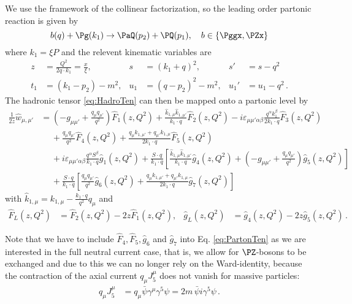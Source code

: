 We use the framework of the collinear factorization, so the leading order partonic reaction is given by
\begin{equation}
b(q) + \Pg(k_1) \to \PaQ(p_2) + \PQ(p_1),\quad b\in\{\Pggx,\PZx\}
\end{equation}
where $k_1 = \xi P$ and the relevent kinematic variables are
\begin{align}
z &= \frac{Q^2}{2q\cdot k_1} = \frac {x}{\xi}, &s &= (k_1+q)^2, &s' &= s-q^2\nonumber\\
t_1 &= (k_1-p_2) - m^2, &u_1 &= (q-p_2)^2 - m^2, &u_1' &= u_1-q^2\,.
\end{align}
The hadronic tensor \ref{eq:HadroTen} can then be mapped onto a partonic level by
\begin{align}
\frac 1 {2z} \hat w_{\mu,\mu'} &= (-g_{\mu\mu'} + \frac{q_\mu q_{\mu'}}{q^2}) \hat F_1(z,Q^2) + \frac{\hat k_{1,\mu} \hat k_{1,\mu'}}{k_1\cdot q} \hat F_2(z,Q^2) - i\varepsilon_{\mu\mu'\alpha\beta} \frac{q^\alpha k_1^\beta}{2k_1\cdot q} \hat F_3(z,Q^2) \nonumber\\
 &\hspace{15pt} + \frac{q_\mu q_{\mu'}}{q^2} \hat F_4(z,Q^2) + \frac{q_\mu k_{1,\mu'} + q_{\mu'}k_{1,\mu}}{2k_1\cdot q} \hat F_5(z,Q^2)  \nonumber\\
 &\hspace{15pt} + i\varepsilon_{\mu\mu'\alpha\beta} \frac{q^\alpha S^\beta}{k_1\cdot q} \hat g_1(z,Q^2) + \frac{S\cdot q}{k_1\cdot q}\left[\frac{\hat k_{1,\mu} \hat k_{1,\mu'}}{k_1\cdot q}\hat g_4(z,Q^2) + (-g_{\mu\mu'} + \frac{q_\mu q_{\mu'}}{q^2}) \hat g_5(z,Q^2)\right] \nonumber\\
 &\hspace{15pt} + \frac{S\cdot q}{k_1\cdot q}\left[\frac{q_\mu q_{\mu'}}{q^2} \hat g_6(z,Q^2) + \frac{q_\mu k_{1,\mu'} + q_{\mu'}k_{1,\mu}}{2k_1\cdot q} \hat g_7(z,Q^2)  \right]
\label{eq:PartonTen}
\end{align}
with $\hat k_{1,\mu} = k_{1,\mu} - \frac{k_1\cdot q}{q^2}q_\mu$ and
\begin{align}
\hat F_L(z,Q^2) &= \hat F_2(z,Q^2) - 2z\hat F_1(z,Q^2), &\hat g_L(z,Q^2) &= \hat g_4(z,Q^2) - 2z\hat g_5(z,Q^2)\,.
\end{align}

Note that we have to include $\hat F_4,\hat F_5,\hat g_6$ and $\hat g_7$ into Eq. \ref{eq:PartonTen} as we are interested in the full neutral current case, that is, we allow for $\PZ$-bosons to be exchanged and due to this we can no longer rely on the Ward-identity, because the contraction of the axial current $q_\mu J^\mu_5$ does not vanish for massive particles:
\begin{align}
q_\mu J^{\mu}_5 &= q_\mu \bar \psi \gamma^\mu \gamma^5\psi = 2m\,\bar \psi i \gamma^5\psi\,.
\end{align}


